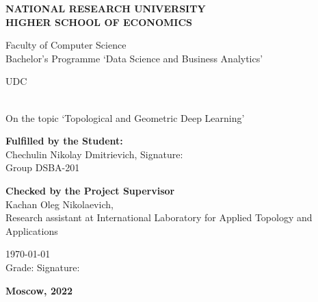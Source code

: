 %
%

\begin{titlepage}
    \begin{center}
          \textbf{\MakeUppercase{National Research University\\ Higher School of Economics}}

          \vspace*{1cm}

          Faculty of Computer Science\\
          Bachelor's Programme `Data Science and Business Analytics'
    \end{center}

    UDC \underbar{\hspace{3cm}}

    \vspace*{1.5cm}

    \\
    On the topic `Topological and Geometric Deep Learning'

    \vspace*{2cm}

    \begin{flushleft}
        \textbf{Fulfilled by the Student:}\\
        Chechulin Nikolay Dmitrievich, Signature: \underbar{\hspace{3cm}}\\
        Group DSBA-201
        
        \vspace*{1cm}
        
        \textbf{Checked by the Project Supervisor}\\
        Kachan Oleg Nikolaevich,\\
        Research assistant at International Laboratory for Applied Topology and Applications

        \today \hspace*{1cm}\\
        Grade: \underbar{\hspace{1.5cm}} \hspace*{1cm}
        Signature: \underbar{\hspace{3cm}}

    \end{flushleft}

    \vfill
    \textbf{Moscow, 2022}
\end{titlepage}
